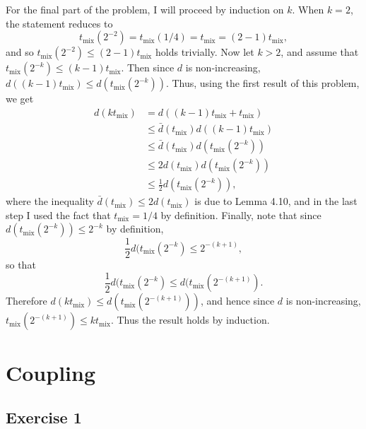 \documentclass[12pt]{article}
\begin{document}
For the final part of the problem, I will proceed by induction on $k$. When $k = 2$, the statement reduces to
\begin{equation*}
t_\mathrm{mix}(2^{-2}) = t_\mathrm{mix}(1/4) = t_\mathrm{mix} = (2 - 1)t_\mathrm{mix},
\end{equation*}
and so $t_\mathrm{mix}(2^{-2}) \leq (2 - 1)t_\mathrm{mix}$ holds trivially. Now let $k > 2$, and assume that $t_\mathrm{mix}(2^{-k}) \leq (k - 1)t_\mathrm{mix}$. Then since $d$ is non-increasing, $d((k - 1)t_\mathrm{mix}) \leq d(t_\mathrm{mix}(2^{-k}))$. Thus, using the first result of this problem, we get
\begin{align*}
d(kt_\mathrm{mix}) &= d((k - 1)t_\mathrm{mix} + t_\mathrm{mix}) \\
&\leq \bar{d}(t_\mathrm{mix}) d((k - 1)t_\mathrm{mix}) \\
&\leq \bar{d}(t_\mathrm{mix}) d(t_\mathrm{mix}(2^{-k})) \\
&\leq 2d(t_\mathrm{mix}) d(t_\mathrm{mix}(2^{-k})) \\
&\leq \frac{1}{2} d(t_\mathrm{mix}(2^{-k})),
\end{align*}
where the inequality $\bar{d}(t_\mathrm{mix}) \leq 2d(t_\mathrm{mix})$ is due to Lemma 4.10, and in the last step I used the fact that $t_\mathrm{mix} = 1/4$ by definition. Finally, note that since $d(t_\mathrm{mix}(2^{-k})) \leq 2^{-k}$ by definition,
\begin{equation*}
\frac{1}{2} d(t_\mathrm{mix}(2^{-k}) \leq 2^{-(k+1)},
\end{equation*}
so that
\begin{equation*}
\frac{1}{2} d(t_\mathrm{mix}(2^{-k}) \leq d(t_\mathrm{mix}(2^{-(k+1)}).
\end{equation*}
Therefore $d(kt_\mathrm{mix}) \leq d(t_\mathrm{mix}(2^{-(k+1)}))$, and hence since $d$ is non-increasing, $t_\mathrm{mix}(2^{-(k+1)}) \leq kt_\mathrm{mix}$. Thus the result holds by induction.

\section*{Coupling}

\subsection*{Exercise 1}
\end{document}
